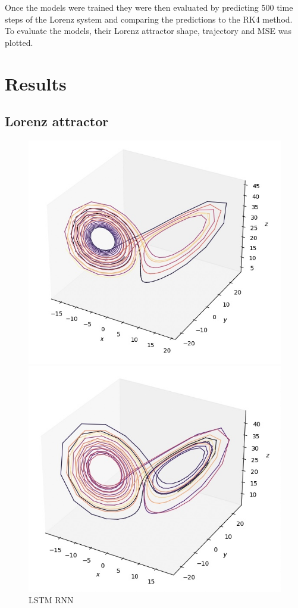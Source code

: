 \documentclass[11pt]{article}
\begin{document}
Once the models were trained they were then evaluated by predicting 500 time steps of the Lorenz system and comparing the predictions to the RK4 method. To evaluate the models, their Lorenz attractor shape, trajectory and MSE
was plotted.

\section{Results}
\subsection{Lorenz attractor}
\begin{figure}[ht]
    \centering
    \begin{minipage}{0.32\textwidth}
        \centering
        \includegraphics[width=\textwidth]{rnn_lorenz.jpeg}
        \caption{LSTM RNN}
        \label{fig:rnn_lorenz}
    \end{minipage}
    \hfill
    \begin{minipage}{0.32\textwidth}
        \centering
        \includegraphics[width=\textwidth]{echo_lorenz.jpeg}

\end{minipage}
\end{figure}
\end{document}
